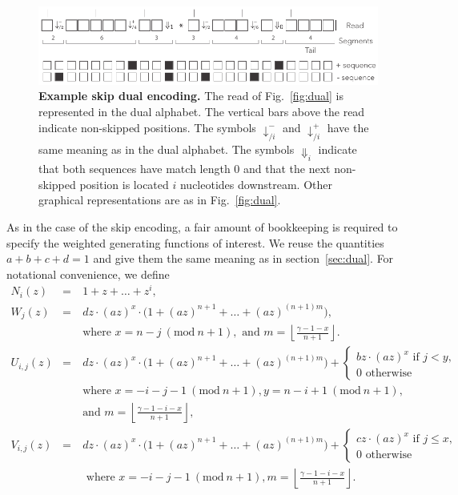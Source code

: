 \documentclass{article}
\newcommand{\modulo}[1]{\ (\mathrm{mod}\ #1)}
\begin{document}
\begin{figure}[h]
\centering
\includegraphics[scale=0.85]{sketch_skip_dual.pdf}
\caption{\textbf{Example skip dual encoding.}
The read of Fig.~\ref{fig:dual} is represented in the dual alphabet. The
vertical bars above the read indicate non-skipped positions. The symbols
$\downarrow_{/i}^-$ and $\downarrow_{/i}^+$ have the same meaning as in
the dual alphabet. The symbols $\Downarrow_i$ indicate that both sequences
have match length 0 and that the next non-skipped position is located $i$
nucleotides downstream. Other graphical representations are as in
Fig.~\ref{fig:dual}.}
\label{fig:skip_dual}
\end{figure}

As in the case of the skip encoding, a fair amount of bookkeeping is
required to specify the weighted generating functions of interest.
We reuse the quantities $a+b+c+d=1$ and give them the same meaning as in
section~\ref{sec:dual}. For notational convenience, we define
\begin{eqnarray*}
N_i(z) &=& 1+z+\ldots+z^i, \\
W_j(z) &=& dz \cdot (az)^x \cdot \big( 1 + (az)^{n+1} + \ldots +
  (az)^{(n+1)m} \big), \\
  &\quad& \text{where } x = n-j \modulo{n+1},
  \text{ and } m = \left\lfloor
  \frac{\gamma-1-x}{n+1} \right\rfloor. \\
U_{i,j}(z) &=& dz \cdot (az)^x \cdot
  \big( 1 + (az)^{n+1} + \ldots + (az)^{(n+1)m} \big) +
\begin{cases}
  bz\cdot(az)^x \text{ if } j < y, \\
  0 \text{ otherwise}
\end{cases} \\
  &\quad& \text{where } x = -i-j-1 \modulo{n+1},
  y = n-i+1 \modulo{n+1}, \\
  &\quad& \text{and } m = \left\lfloor \frac{\gamma-1-i-x}{n+1}
    \right\rfloor, \\
V_{i,j}(z) &=& dz \cdot (az)^x \cdot
  \big( 1 + (az)^{n+1} + \ldots + (az)^{(n+1)m} \big) +
\begin{cases}
  cz\cdot(az)^x \text{ if } j \leq x, \\
  0 \text{ otherwise}
\end{cases} \\
  &\quad& \text{ where } x = -i-j-1 \modulo{n+1},
  m = \left\lfloor \frac{\gamma-1-i-x}{n+1} \right\rfloor.
\end{eqnarray*}
\end{document}
